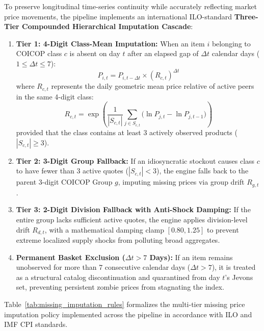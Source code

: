 \hs To preserve longitudinal time-series continuity while accurately reflecting market price movements, the pipeline implements an international ILO-standard \textbf{Three-Tier Compounded Hierarchical Imputation Cascade}:
\begin{enumerate}
    \item \textbf{Tier 1: 4-Digit Class-Mean Imputation:} When an item $i$ belonging to COICOP class $c$ is absent on day $t$ after an elapsed gap of $\Delta t$ calendar days ($1 \le \Delta t \le 7$):
    \begin{equation}
        \widehat{P}_{i, t} = P_{i, t - \Delta t} \times \left( R_{c, t} \right)^{\Delta t}
    \end{equation}
    where $R_{c, t}$ represents the daily geometric mean price relative of active peers in the same 4-digit class:
    \begin{equation}
        R_{c, t} = \exp\left( \frac{1}{|S_{c, t}|} \sum_{j \in S_{c, t}} \big(\ln P_{j, t} - \ln P_{j, t-1}\big) \right)
    \end{equation}
    provided that the class contains at least 3 actively observed products ($|S_{c, t}| \ge 3$).
    \item \textbf{Tier 2: 3-Digit Group Fallback:} If an idiosyncratic stockout causes class $c$ to have fewer than 3 active quotes ($|S_{c, t}| < 3$), the engine falls back to the parent 3-digit COICOP Group $g$, imputing missing prices via group drift $R_{g, t}$.
    \item \textbf{Tier 3: 2-Digit Division Fallback with Anti-Shock Damping:} If the entire group lacks sufficient active quotes, the engine applies division-level drift $R_{d, t}$, with a mathematical damping clamp $[0.80, 1.25]$ to prevent extreme localized supply shocks from polluting broad aggregates.
    \item \textbf{Permanent Basket Exclusion ($\Delta t > 7$ Days):} If an item remains unobserved for more than 7 consecutive calendar days ($\Delta t > 7$), it is treated as a structural catalog discontinuation and quarantined from day $t$'s Jevons set, preventing persistent zombie prices from stagnating the index.
\end{enumerate}

\hs Table~\ref{tab:missing_imputation_rules} formalizes the multi-tier missing price imputation policy implemented across the pipeline in accordance with ILO and IMF CPI standards.

